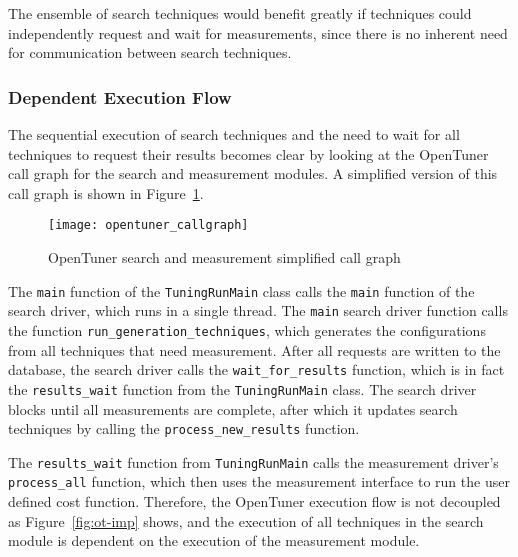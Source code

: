 The ensemble of search techniques would benefit greatly if techniques could
independently request and wait for measurements, since there is no inherent
need for communication between search techniques.

\subsubsection{Dependent Execution Flow}

The sequential execution of search techniques and the need to wait for all
techniques to request their results becomes clear by looking at the OpenTuner
call graph for the search and measurement modules.  A simplified version of
this call graph is shown in Figure~\ref{fig:opentuner_callgraph}.

\begin{figure}[htpb]
    \centering
    \texttt{[image: opentuner\_callgraph]}
    \caption{OpenTuner search and measurement simplified call graph}
    \label{fig:opentuner_callgraph}
\end{figure}

The \texttt{main} function of the \texttt{TuningRunMain} class calls the
\texttt{main} function of the search driver, which runs in a single thread.
The \texttt{main} search driver function calls the function
\texttt{run\_generation\_techniques}, which generates the
configurations from all techniques that need measurement.  After all requests
are written to the database, the search driver calls the
\texttt{wait\_for\_results} function, which is in fact the
\texttt{results\_wait} function from the \texttt{TuningRunMain} class.  The
search driver blocks until all measurements are complete, after which it
updates search techniques by calling the \texttt{process\_new\_results}
function.

The \texttt{results\_wait} function from \texttt{TuningRunMain} calls the
measurement driver's \texttt{process\_all} function, which then uses the
measurement interface to run the user defined cost function.  Therefore, the
OpenTuner execution flow is not decoupled as Figure~\ref{fig:ot-imp} shows, and
the execution of all techniques in the search module is dependent on the
execution of the measurement module.

